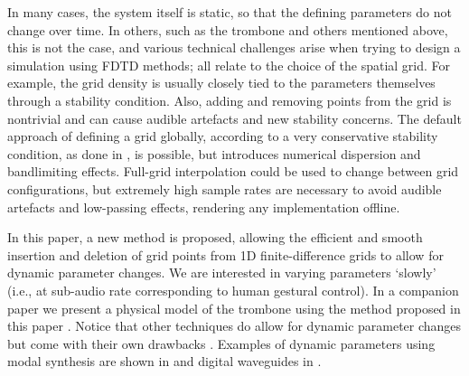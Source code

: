 In many cases, the system itself is static, so that the defining parameters do not change over time. In others, such as the trombone and others mentioned above, this is not the case, and various technical challenges arise when trying to design a simulation using FDTD methods; all relate to the choice of the spatial grid. For example, the grid density is usually closely tied to the parameters themselves through a stability condition.
Also, adding and removing points from the grid is nontrivial and can cause audible artefacts and new stability concerns. The default approach of defining a grid globally, according to a very conservative stability condition, as done in \cite{Willemsen2019}, is possible, but introduces numerical dispersion and bandlimiting effects. Full-grid interpolation \cite[Ch. 5]{bilbao2009} could be used to change between grid configurations, but extremely high sample rates are necessary to avoid audible artefacts and low-passing effects, rendering any implementation offline. 

In this paper, a new method is proposed, allowing the efficient and smooth insertion and deletion of grid points from 1D finite-difference grids to allow for dynamic parameter changes. We are interested in varying parameters `slowly' (i.e., at sub-audio rate corresponding to human gestural control). In a companion paper we present a physical model of the trombone using the method proposed in this paper \cite{Willemsen2021}. Notice that other techniques do allow for dynamic parameter changes but come with their own drawbacks \cite{bilbao2009}. Examples of dynamic parameters using modal synthesis \cite{morrison1993mosaic} are shown in \cite{Mehes2016, Willemsen2017} and digital waveguides \cite{Smith1992} in \cite{Michon2014}.



